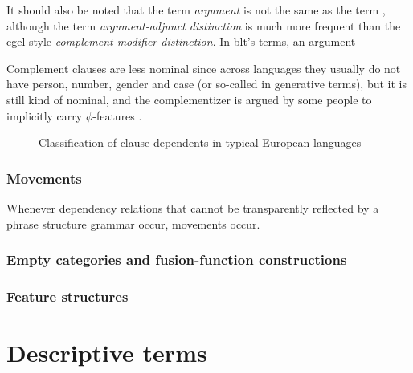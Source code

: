 \documentclass[../main.tex]{subfiles}
\begin{document}
It should also be noted that the term \emph{argument} is not the same as the term , 
although the term \emph{argument-adjunct distinction} is much more frequent than the \ac{cgel}-style 
\emph{complement-modifier distinction}.
In \ac{blt}'s terms, an argument %

Complement clauses are less nominal since across languages they usually do not have person, number, gender and 
case (or so-called  in generative terms), but it is still kind of nominal, 
and the complementizer is argued by some people to implicitly carry $\phi$-features \citep{complement-clause}.

\begin{figure}
    \centering
    
    \caption{Classification of clause dependents in typical European languages}
\end{figure}


\subsubsection{Movements}

Whenever dependency relations that cannot be transparently reflected by a phrase structure grammar occur,
movements occur.

\subsubsection{Empty categories and fusion-function constructions}

\subsubsection{Feature structures}


\section{Descriptive terms}
\end{document}
